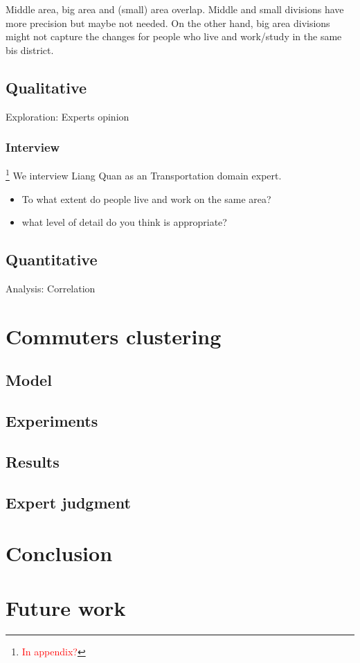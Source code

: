 \documentclass{article}
\newcommand{\selfnote}[1]{\footnote{\textcolor{red}{#1}}}
\begin{document}
Middle area, big area and (small) area overlap. Middle and small divisions have more precision but maybe not needed. On the other hand, big area divisions might not capture the changes for people who live and work/study in the same bis district. 

\subsection{Qualitative}
Exploration: Experts opinion

\subsubsection{Interview}
\selfnote{In appendix?}
We interview Liang Quan as an Transportation domain expert. 

\begin{itemize}
\item To what extent do people live and work on the same area?
\item what level of detail do you think is appropriate?
\end{itemize}

\subsection{Quantitative}
Analysis: Correlation


\newpage
\section{Commuters clustering}
\subsection{Model}

\subsection{Experiments}

\subsection{Results}

\subsection{Expert judgment}


\newpage
\section{Conclusion}


\newpage
\section{Future work}

\newpage
{}

\end{document}
